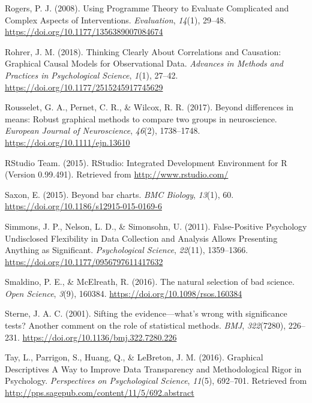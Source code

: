 \documentclass[british,man]{apa6}
\begin{document}
\leavevmode\hypertarget{ref-rogersUsingProgrammeTheory2008a}{}%
Rogers, P. J. (2008). Using Programme Theory to Evaluate Complicated and Complex Aspects of Interventions. \emph{Evaluation}, \emph{14}(1), 29--48. \url{https://doi.org/10.1177/1356389007084674}

\leavevmode\hypertarget{ref-rohrerThinkingClearlyCorrelations2018}{}%
Rohrer, J. M. (2018). Thinking Clearly About Correlations and Causation: Graphical Causal Models for Observational Data. \emph{Advances in Methods and Practices in Psychological Science}, \emph{1}(1), 27--42. \url{https://doi.org/10.1177/2515245917745629}

\leavevmode\hypertarget{ref-rousseletDifferencesMeansRobust2017}{}%
Rousselet, G. A., Pernet, C. R., \& Wilcox, R. R. (2017). Beyond differences in means: Robust graphical methods to compare two groups in neuroscience. \emph{European Journal of Neuroscience}, \emph{46}(2), 1738--1748. \url{https://doi.org/10.1111/ejn.13610}

\leavevmode\hypertarget{ref-rstudioteamRStudioIntegratedDevelopment2015}{}%
RStudio Team. (2015). RStudio: Integrated Development Environment for R (Version 0.99.491). Retrieved from \url{http://www.rstudio.com/}

\leavevmode\hypertarget{ref-saxonBarCharts2015}{}%
Saxon, E. (2015). Beyond bar charts. \emph{BMC Biology}, \emph{13}(1), 60. \url{https://doi.org/10.1186/s12915-015-0169-6}

\leavevmode\hypertarget{ref-simmonsFalsePositivePsychologyUndisclosed2011a}{}%
Simmons, J. P., Nelson, L. D., \& Simonsohn, U. (2011). False-Positive Psychology Undisclosed Flexibility in Data Collection and Analysis Allows Presenting Anything as Significant. \emph{Psychological Science}, \emph{22}(11), 1359--1366. \url{https://doi.org/10.1177/0956797611417632}

\leavevmode\hypertarget{ref-smaldinoNaturalSelectionBad2016}{}%
Smaldino, P. E., \& McElreath, R. (2016). The natural selection of bad science. \emph{Open Science}, \emph{3}(9), 160384. \url{https://doi.org/10.1098/rsos.160384}

\leavevmode\hypertarget{ref-sterneSiftingEvidenceWhat2001}{}%
Sterne, J. A. C. (2001). Sifting the evidence---what's wrong with significance tests? Another comment on the role of statistical methods. \emph{BMJ}, \emph{322}(7280), 226--231. \url{https://doi.org/10.1136/bmj.322.7280.226}

\leavevmode\hypertarget{ref-tayGraphicalDescriptivesWay2016}{}%
Tay, L., Parrigon, S., Huang, Q., \& LeBreton, J. M. (2016). Graphical Descriptives A Way to Improve Data Transparency and Methodological Rigor in Psychology. \emph{Perspectives on Psychological Science}, \emph{11}(5), 692--701. Retrieved from \url{http://pps.sagepub.com/content/11/5/692.abstract}
\end{document}
